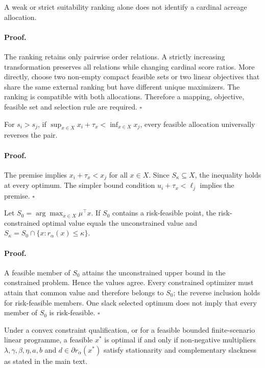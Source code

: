 \begin{proposition}
A weak or strict suitability ranking alone does not identify a cardinal acreage allocation.
\end{proposition}
\paragraph{Proof.} The ranking retains only pairwise order relations. A strictly increasing transformation preserves all relations while changing cardinal score ratios. More directly, choose two non-empty compact feasible sets or two linear objectives that share the same external ranking but have different unique maximizers. The ranking is compatible with both allocations. Therefore a mapping, objective, feasible set and selection rule are required. \hfill$\square$

\begin{proposition}
For $s_i>s_j$, if $\sup_{x\in X}x_i+\tau_x<\inf_{x\in X}x_j$, every feasible allocation universally reverses the pair.
\end{proposition}
\paragraph{Proof.} The premise implies $x_i+\tau_x<x_j$ for all $x\in X$. Since $S_\kappa\subseteq X$, the inequality holds at every optimum. The simpler bound condition $u_i+\tau_x<\ell_j$ implies the premise. \hfill$\square$

\begin{proposition}
Let $S_0=\arg\max_{x\in X}\mu^\top x$. If $S_0$ contains a risk-feasible point, the risk-constrained optimal value equals the unconstrained value and $S_\kappa=S_0\cap\{x:r_\alpha(x)\leq\kappa\}$.
\end{proposition}
\paragraph{Proof.} A feasible member of $S_0$ attains the unconstrained upper bound in the constrained problem. Hence the values agree. Every constrained optimizer must attain that common value and therefore belongs to $S_0$; the reverse inclusion holds for risk-feasible members. One slack selected optimum does not imply that every member of $S_0$ is risk-feasible. \hfill$\square$

\begin{theorem}
Under a convex constraint qualification, or for a feasible bounded finite-scenario linear programme, a feasible $x^*$ is optimal if and only if non-negative multipliers $\lambda,\gamma,\beta,\eta,a,b$ and $d\in\partial r_\alpha(x^*)$ satisfy stationarity and complementary slackness as stated in the main text.
\end{theorem}
